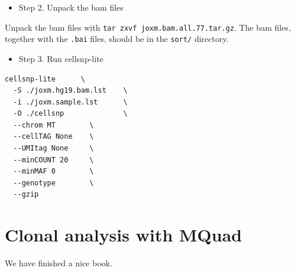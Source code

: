 \documentclass[
]{book}
\providecommand{\tightlist}{%
  \setlength{\itemsep}{0pt}\setlength{\parskip}{0pt}}
\begin{document}
\begin{itemize}
\tightlist
\item
  Step 2. Unpack the bam files
\end{itemize}

Unpack the bam files with \texttt{tar\ zxvf\ joxm.bam.all.77.tar.gz}. The bam files, together with the \texttt{.bai} files, should be in the \texttt{sort/} directory.

\begin{itemize}
\tightlist
\item
  Step 3. Run cellsnp-lite
\end{itemize}

\begin{verbatim}
cellsnp-lite      \
  -S ./joxm.hg19.bam.lst    \
  -i ./joxm.sample.lst      \
  -O ./cellsnp              \
  --chrom MT        \
  --cellTAG None    \
  --UMItag None     \
  --minCOUNT 20     \
  --minMAF 0        \
  --genotype        \
  --gzip
\end{verbatim}

\hypertarget{clonal-analysis-with-mquad}{%
\section{Clonal analysis with MQuad}\label{clonal-analysis-with-mquad}}

We have finished a nice book.

  
\end{document}
